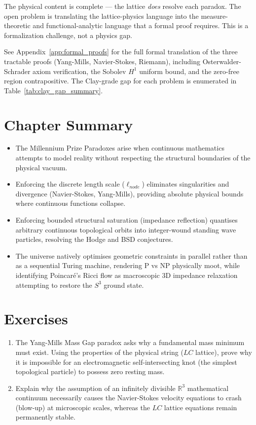 \noindent The physical content is complete --- the lattice \emph{does} resolve each paradox. The open problem is translating the lattice-physics language into the measure-theoretic and functional-analytic language that a formal proof requires. This is a formalization challenge, not a physics gap.

See Appendix~\ref{app:formal_proofs} for the full formal translation of the three tractable proofs (Yang-Mills, Navier-Stokes, Riemann), including Osterwalder-Schrader axiom verification, the Sobolev $H^1$ uniform bound, and the zero-free region contrapositive. The Clay-grade gap for each problem is enumerated in Table~\ref{tab:clay_gap_summary}.

\section*{Chapter Summary}
\begin{itemize}
    \item The Millennium Prize Paradoxes arise when continuous mathematics attempts to model reality without respecting the structural boundaries of the physical vacuum.
    \item Enforcing the discrete length scale ($\ell_{node}$) eliminates singularities and divergence (Navier-Stokes, Yang-Mills), providing absolute physical bounds where continuous functions collapse.
    \item Enforcing bounded structural saturation (impedance reflection) quantises arbitrary continuous topological orbits into integer-wound standing wave particles, resolving the Hodge and BSD conjectures.
    \item The universe natively optimises geometric constraints in parallel rather than as a sequential Turing machine, rendering P vs NP physically moot, while identifying Poincar\'e's Ricci flow as macroscopic 3D impedance relaxation attempting to restore the $S^3$ ground state.
\end{itemize}

\section*{Exercises}
\begin{enumerate}
    \item The Yang-Mills Mass Gap paradox asks why a fundamental mass minimum must exist. Using the properties of the physical string ($LC$ lattice), prove why it is impossible for an electromagnetic self-intersecting knot (the simplest topological particle) to possess zero resting mass.
    \item Explain why the assumption of an infinitely divisible $\mathbb{R}^3$ mathematical continuum necessarily causes the Navier-Stokes velocity equations to crash (blow-up) at microscopic scales, whereas the $LC$ lattice equations remain permanently stable.
\end{enumerate}

